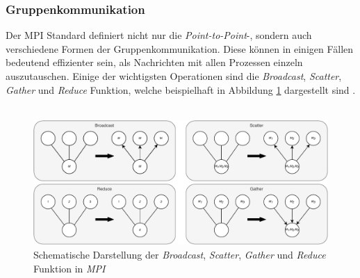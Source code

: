 \subsubsection{Gruppenkommunikation}
Der \ac{MPI} Standard definiert nicht nur die \emph{Point-to-Point}-, sondern auch verschiedene Formen der Gruppenkommunikation. Diese können in einigen Fällen bedeutend effizienter sein, als Nachrichten mit allen Prozessen einzeln auszutauschen. Einige der wichtigsten Operationen sind die \emph{Broadcast}, \emph{Scatter}, \emph{Gather} und \emph{Reduce} Funktion, welche beispielhaft in Abbildung \ref{fig:mpi_group_communication} dargestellt sind \cite{dongarra1995introduction}.
\\\\
\begin{figure}[!h]
	\centering
	\includegraphics[width=1\textwidth]{./img/mpi_group_communication.pdf} 
	\caption{Schematische Darstellung der \emph{Broadcast}, \emph{Scatter}, \emph{Gather} und \emph{Reduce} Funktion in \emph{MPI}}
	\label{fig:mpi_group_communication}
\end{figure}

